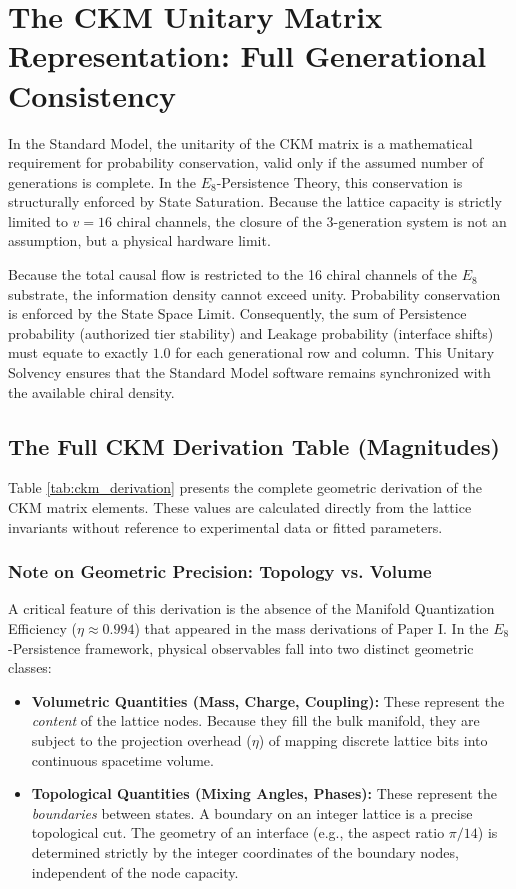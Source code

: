 \section{The CKM Unitary Matrix Representation: Full Generational Consistency}

In the Standard Model, the unitarity of the CKM matrix is a mathematical requirement for probability conservation, valid only if the assumed number of generations is complete.  In the $E_8$-Persistence Theory, this conservation is structurally enforced by State Saturation. Because the lattice capacity is strictly limited to $v=16$ chiral channels, the closure of the 3-generation system is not an assumption, but a physical hardware limit.

Because the total causal flow is restricted to the 16 chiral channels of the $E_8$ substrate, the information density cannot exceed unity. Probability conservation is enforced by the State Space Limit. Consequently, the sum of Persistence probability (authorized tier stability) and Leakage probability (interface shifts) must equate to exactly $1.0$ for each generational row and column. This Unitary Solvency ensures that the Standard Model software remains synchronized with the available chiral density.

\subsection{The Full CKM Derivation Table (Magnitudes)}

Table \ref{tab:ckm_derivation} presents the complete geometric derivation of the CKM matrix elements. These values are calculated directly from the lattice invariants without reference to experimental data or fitted parameters.

\subsubsection*{Note on Geometric Precision: Topology vs. Volume}

A critical feature of this derivation is the absence of the Manifold Quantization Efficiency ($\eta \approx 0.994$) that appeared in the mass derivations of Paper I. In the $E_8$-Persistence framework, physical observables fall into two distinct geometric classes:

\begin{itemize}
    \item \textbf{Volumetric Quantities (Mass, Charge, Coupling):} These represent the \emph{content} of the lattice nodes. Because they fill the bulk manifold, they are subject to the projection overhead ($\eta$) of mapping discrete lattice bits into continuous spacetime volume.
    
    \item \textbf{Topological Quantities (Mixing Angles, Phases):} These represent the \emph{boundaries} between states. A boundary on an integer lattice is a precise topological cut. The geometry of an interface (e.g., the aspect ratio $\pi/14$) is determined strictly by the integer coordinates of the boundary nodes, independent of the node capacity.
\end{itemize}

